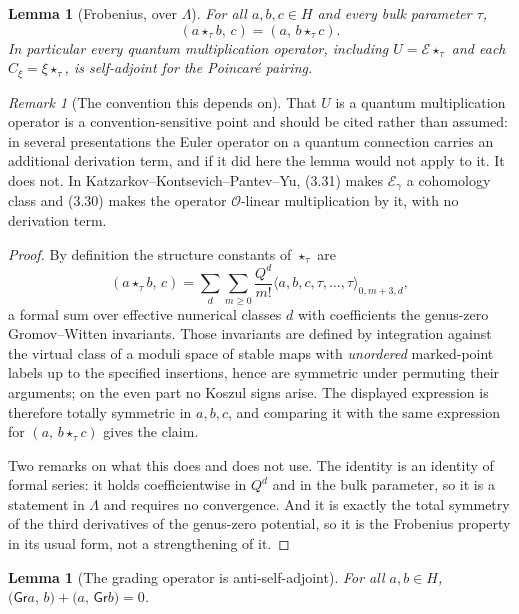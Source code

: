 \documentclass[11pt]{article}
\newtheorem{lemma}[theorem]{Lemma}
\theoremstyle{definition}
\theoremstyle{remark}
\newtheorem{remark}[theorem]{Remark}
\newcommand{\Eu}{\mathcal E}
\newcommand{\Gr}{\mathsf{Gr}}
\newcommand{\Nov}{\Lambda}
\begin{document}
\begin{lemma}[Frobenius, over $\Nov$]
\label{lem:frobenius}
For all $a,b,c\in H$ and every bulk parameter $\tau$,
\[
  (a\star_\tau b,\,c)=(a,\,b\star_\tau c).
\]
In particular every quantum multiplication operator, including $U=\Eu\star_\tau$
and each $C_\xi=\xi\star_\tau$, is self-adjoint for the Poincar\'e pairing.
\end{lemma}

\begin{remark}[The convention this depends on]
That $U$ is a quantum multiplication operator is a convention-sensitive point and
should be cited rather than assumed: in several presentations the Euler operator
on a quantum connection carries an additional derivation term, and if it did
here the lemma would not apply to it. It does not. In
Katzarkov--Kontsevich--Pantev--Yu, (3.31) makes $\Eu_\gamma$ a cohomology class
and (3.30) makes the operator $\mathcal O$-linear multiplication by it, with no
derivation term.
\end{remark}

\begin{proof}
By definition the structure constants of $\star_\tau$ are
\[
  (a\star_\tau b,\,c)
  =\sum_{d}\sum_{m\ge0}\frac{Q^d}{m!}
   \bigl\langle a,b,c,\tau,\dots,\tau\bigr\rangle_{0,m+3,d},
\]
a formal sum over effective numerical classes $d$ with coefficients the
genus-zero Gromov--Witten invariants. Those invariants are defined by
integration against the virtual class of a moduli space of stable maps with
\emph{unordered} marked-point labels up to the specified insertions, hence are
symmetric under permuting their arguments; on the even part no Koszul signs
arise. The displayed expression is therefore totally symmetric in $a,b,c$, and
comparing it with the same expression for $(a,\,b\star_\tau c)$ gives the claim.

Two remarks on what this does and does not use. The identity is an identity of
formal series: it holds coefficientwise in $Q^d$ and in the bulk parameter, so
it is a statement in $\Nov$ and requires no convergence. And it is exactly the
total symmetry of the third derivatives of the genus-zero potential, so it is
the Frobenius property in its usual form, not a strengthening of it.
\end{proof}

\begin{lemma}[The grading operator is anti-self-adjoint]
\label{lem:grading}
For all $a,b\in H$, $\bigl(\Gr a,\,b\bigr)+\bigl(a,\,\Gr b\bigr)=0$.
\end{lemma}
\end{document}
